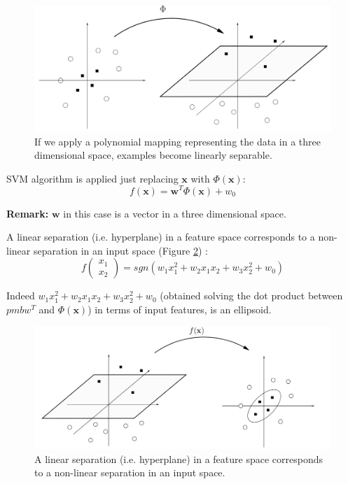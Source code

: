 \begin{figure}
    \centering
    \includegraphics[width=\textwidth]{images/esempio_polynomial_mapping.png}
    \caption{If we apply a polynomial mapping representing the data in a three dimensional space, examples become linearly separable.}
    \label{fig:example_polinomial_mapping}
\end{figure}

SVM algorithm is applied just replacing $\pmb{x}$ with $\Phi(\pmb{x})$:
\begin{equation}
    f(\pmb{x}) = \pmb{w}^T \Phi(\pmb{x}) + w_0
\end{equation}

\textbf{Remark:} $\pmb{w}$ in this case is a vector in a three dimensional space. \newline

A linear separation (i.e. hyperplane) in a feature space corresponds to a non-linear separation in an input space (Figure \ref{fig:fromHighToLowSpace}) :
$$f(\begin{matrix} x_1 \\ x_2\end{matrix}) = \mathit{sgn}(w_1 x_1^2 + w_2 x_1 x_2 + w_3 x_2^2 + w_0)$$

Indeed $w_1 x_1^2 + w_2 x_1 x_2 + w_3 x_2^2 + w_0$ (obtained solving the dot product between $pmb{w}^T$ and $\Phi(\pmb{x})$) in terms of input features, is an ellipsoid. \newline

\begin{figure}
    \centering
    \includegraphics[width=\textwidth]{images/fromHighToLowSpace.png}
    \caption{A linear separation (i.e. hyperplane) in a feature space corresponds to a non-linear separation in an input space.}
    \label{fig:fromHighToLowSpace}
\end{figure}

